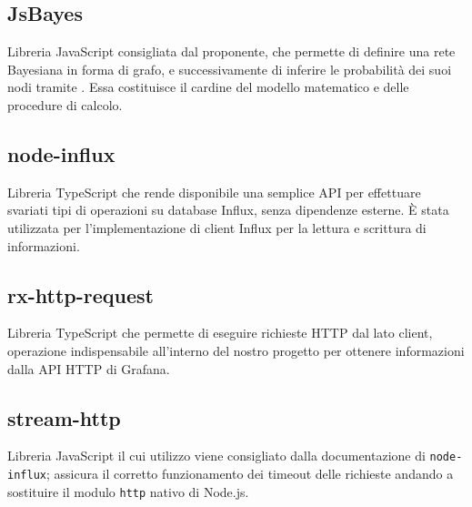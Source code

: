 \subsection{JsBayes}
Libreria JavaScript consigliata dal proponente, che permette di definire una rete Bayesiana in forma di grafo, e successivamente di inferire le probabilità dei suoi nodi tramite . Essa costituisce il cardine del modello matematico e delle procedure di calcolo.

\subsection{node-influx}
Libreria TypeScript che rende disponibile una semplice API per effettuare svariati tipi di operazioni su database Influx, senza dipendenze esterne. È stata utilizzata per l'implementazione di client Influx per la lettura e scrittura di informazioni.

\subsection{rx-http-request}
Libreria TypeScript che permette di eseguire richieste HTTP dal lato client, operazione indispensabile all'interno del nostro progetto per ottenere informazioni dalla API HTTP di Grafana. 

\subsection{stream-http}
Libreria JavaScript il cui utilizzo viene consigliato dalla documentazione di \texttt{node-influx}; assicura il corretto funzionamento dei timeout delle richieste andando a sostituire il modulo \texttt{http} nativo di Node.js.